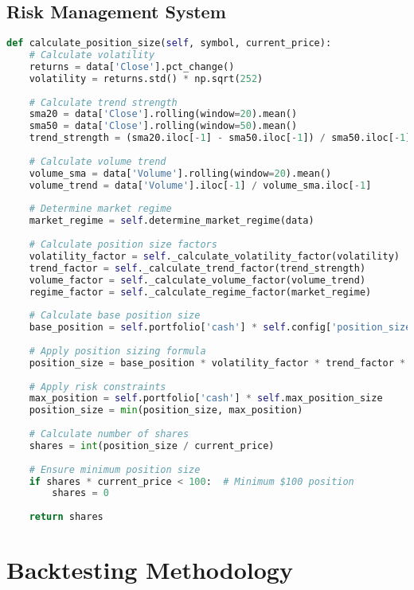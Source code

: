 \documentclass[conference]{IEEEtran}
\begin{document}
\subsection{Risk Management System}
\begin{lstlisting}[language=Python]
def calculate_position_size(self, symbol, current_price):
    # Calculate volatility
    returns = data['Close'].pct_change()
    volatility = returns.std() * np.sqrt(252)
    
    # Calculate trend strength
    sma20 = data['Close'].rolling(window=20).mean()
    sma50 = data['Close'].rolling(window=50).mean()
    trend_strength = (sma20.iloc[-1] - sma50.iloc[-1]) / sma50.iloc[-1]
    
    # Calculate volume trend
    volume_sma = data['Volume'].rolling(window=20).mean()
    volume_trend = data['Volume'].iloc[-1] / volume_sma.iloc[-1]
    
    # Determine market regime
    market_regime = self.determine_market_regime(data)
    
    # Calculate position size factors
    volatility_factor = self._calculate_volatility_factor(volatility)
    trend_factor = self._calculate_trend_factor(trend_strength)
    volume_factor = self._calculate_volume_factor(volume_trend)
    regime_factor = self._calculate_regime_factor(market_regime)
    
    # Calculate base position size
    base_position = self.portfolio['cash'] * self.config['position_size']
    
    # Apply position sizing formula
    position_size = base_position * volatility_factor * trend_factor * volume_factor * regime_factor
    
    # Apply risk constraints
    max_position = self.portfolio['cash'] * self.max_position_size
    position_size = min(position_size, max_position)
    
    # Calculate number of shares
    shares = int(position_size / current_price)
    
    # Ensure minimum position size
    if shares * current_price < 100:  # Minimum $100 position
        shares = 0
    
    return shares
\end{lstlisting}

\section{Backtesting Methodology}
\end{document}
